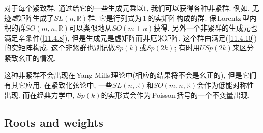 对于每个紧致群, 通过给它的一些生成元乘以$ \mathrm{i}$, 我们可以获得各种非紧群. 例如, 无迹{\emph{虚}}矩阵生成了$ SL(n,\mathds{R}) $群, 它是行列式为\,1\,的实矩阵构成的群. 保\,Lorentz\,型内积的群$ SO(m,n,\mathds{R}) $可以类似地从$ SO(m+n) $获得. 另外一个非紧群的生成元也满足辛条件(\ref{11.4.8}), 但是生成元是虚矩阵而非厄米矩阵, 这个群由满足(\ref{11.4.10})的实矩阵构成. 这个非紧群也别记做$ Sp(k) $或$ Sp(2k)$; 有时用$ USp(2k) $来区分紧致幺正的情况.

这种非紧群不会出现在\,Yang-Mills\,理论中(相应的结果将不会是幺正的), 但是它们有其它应用. 在紧致化弦论中, 一些$ SL(n,\mathds{R}) $和$ SO(m,n,\mathds{R}) $会作为低能对称性出现. 而在经典力学中, $Sp(k) $的实形式会作为\,Poisson\,括号的一个不变量出现.

\subsection*{Roots and weights}

